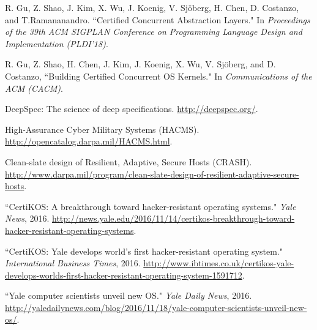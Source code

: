 \documentclass[a4paper, 10pt]{article}
\begin{document}
\begin{footnotesize}
\begin{thebibliography}{}
R. Gu, Z. Shao, J. Kim, X. Wu, J. Koenig, V. Sj\"{o}berg, H. Chen, D. Costanzo, and T.Ramananandro. ``Certified Concurrent Abstraction Layers." In \emph{Proceedings of the  39th ACM SIGPLAN Conference on Programming Language Design and Implementation (PLDI'18)}.


R. Gu, Z. Shao, H. Chen, J. Kim, J. Koenig, X. Wu, V. Sj\"{o}berg, and D. Costanzo, ``Building Certified Concurrent OS Kernels." In \emph{Communications of the ACM (CACM)}.







DeepSpec: The science of deep specifications. 
\url{http://deepspec.org/}.

High-Assurance Cyber Military Systems (HACMS). 
\url{http://opencatalog.darpa.mil/HACMS.html}.

Clean-slate design of Resilient, Adaptive, Secure Hosts (CRASH). 
\url{http://www.darpa.mil/program/clean-slate-design-of-resilient-adaptive-secure-hosts}.

``CertiKOS: A breakthrough toward hacker-resistant operating systems." \emph{Yale News}, 2016.
\url{http://news.yale.edu/2016/11/14/certikos-breakthrough-toward-hacker-resistant-operating-systems}.

``CertiKOS: Yale develops world's first hacker-resistant operating system." \emph{International Business Times}, 2016.
\url{http://www.ibtimes.co.uk/certikos-yale-develops-worlds-first-hacker-resistant-operating-system-1591712}.

``Yale computer scientists unveil new OS." \emph{Yale Daily News}, 2016.
\url{http://yaledailynews.com/blog/2016/11/18/yale-computer-scientists-unveil-new-os/}.



\end{thebibliography}
\end{footnotesize}
\end{document}
